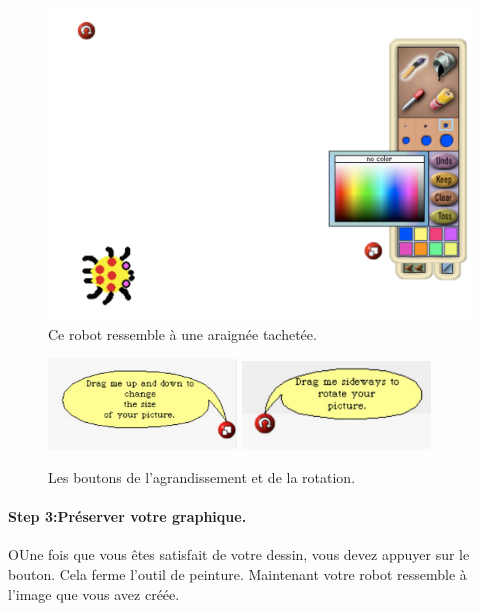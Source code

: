 \documentclass[a4paper,10pt,twoside]{book}
\begin{document}
\begin{figure}[h]
\begin{center}
\includegraphics[width=\textwidth]{editingSpider}
\end{center}
\caption{Ce robot ressemble \`a une araign\'ee tachet\'ee.\label{fig:spottedspider}}
\end{figure}

\begin{figure}[h]
\begin{center}
\includegraphics[width=5cm]{zoomButton} \includegraphics[width=5cm]{rotateButton}
\end{center}
\caption{Les boutons de l'agrandissement et de la rotation. \label{fig:zoomandrotate}}
\end{figure}


\paragraph{Step 3:Pr\'eserver votre graphique.}
OUne fois que vous \^etes satisfait de votre dessin, vous devez appuyer sur le bouton. 
Cela ferme l'outil de peinture. Maintenant votre robot ressemble \`a l'image que vous avez cr\'e\'ee.
\end{document}
